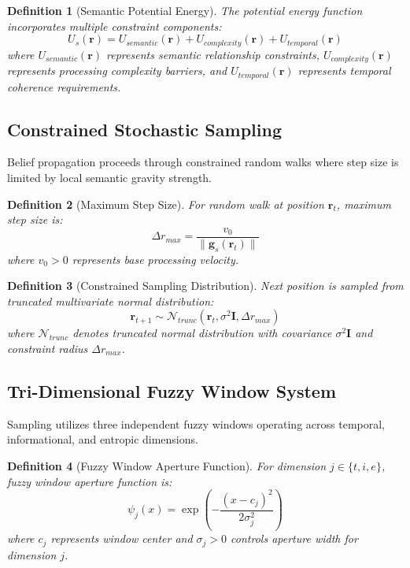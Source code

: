 \documentclass[12pt,a4paper]{article}
\newtheorem{definition}{Definition}
\begin{document}
\begin{definition}[Semantic Potential Energy]
The potential energy function incorporates multiple constraint components:
\begin{equation}
U_s(\mathbf{r}) = U_{semantic}(\mathbf{r}) + U_{complexity}(\mathbf{r}) + U_{temporal}(\mathbf{r})
\end{equation}
where $U_{semantic}(\mathbf{r})$ represents semantic relationship constraints, $U_{complexity}(\mathbf{r})$ represents processing complexity barriers, and $U_{temporal}(\mathbf{r})$ represents temporal coherence requirements.
\end{definition}

\subsection{Constrained Stochastic Sampling}

Belief propagation proceeds through constrained random walks where step size is limited by local semantic gravity strength.

\begin{definition}[Maximum Step Size]
For random walk at position $\mathbf{r}_t$, maximum step size is:
\begin{equation}
\Delta r_{max} = \frac{v_0}{\|\mathbf{g}_s(\mathbf{r}_t)\|}
\end{equation}
where $v_0 > 0$ represents base processing velocity.
\end{definition}

\begin{definition}[Constrained Sampling Distribution]
Next position is sampled from truncated multivariate normal distribution:
\begin{equation}
\mathbf{r}_{t+1} \sim \mathcal{N}_{trunc}(\mathbf{r}_t, \sigma^2 \mathbf{I}, \Delta r_{max})
\end{equation}
where $\mathcal{N}_{trunc}$ denotes truncated normal distribution with covariance $\sigma^2 \mathbf{I}$ and constraint radius $\Delta r_{max}$.
\end{definition}

\subsection{Tri-Dimensional Fuzzy Window System}

Sampling utilizes three independent fuzzy windows operating across temporal, informational, and entropic dimensions.

\begin{definition}[Fuzzy Window Aperture Function]
For dimension $j \in \{t, i, e\}$, fuzzy window aperture function is:
\begin{equation}
\psi_j(x) = \exp\left(-\frac{(x - c_j)^2}{2\sigma_j^2}\right)
\end{equation}
where $c_j$ represents window center and $\sigma_j > 0$ controls aperture width for dimension $j$.
\end{definition}
\end{document}
